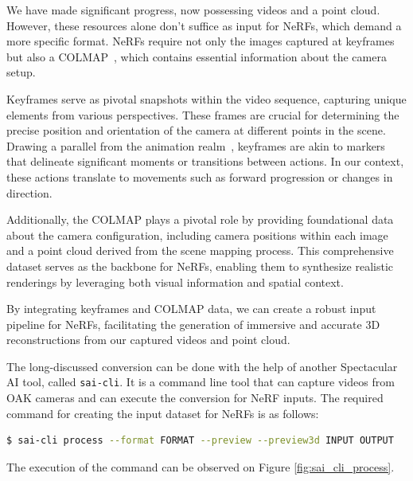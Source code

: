 We have made significant progress, now possessing videos and a point cloud. However, these resources alone don't suffice as input for NeRFs, which demand a more specific format. NeRFs require not only the images captured at keyframes but also a COLMAP~\cite{colmap}, which contains essential information about the camera setup.

Keyframes serve as pivotal snapshots within the video sequence, capturing unique elements from various perspectives. These frames are crucial for determining the precise position and orientation of the camera at different points in the scene. Drawing a parallel from the animation realm~\cite{keyframes_in_animation}, keyframes are akin to markers that delineate significant moments or transitions between actions. In our context, these actions translate to movements such as forward progression or changes in direction.

Additionally, the COLMAP plays a pivotal role by providing foundational data about the camera configuration, including camera positions within each image and a point cloud derived from the scene mapping process. This comprehensive dataset serves as the backbone for NeRFs, enabling them to synthesize realistic renderings by leveraging both visual information and spatial context.

By integrating keyframes and COLMAP data, we can create a robust input pipeline for NeRFs, facilitating the generation of immersive and accurate 3D reconstructions from our captured videos and point cloud.

The long-discussed conversion can be done with the help of another Spectacular AI tool, called \verb|sai-cli|. It is a command line tool that can capture videos from OAK cameras and can execute the conversion for NeRF inputs. The required command for creating the input dataset for NeRFs is as follows:

\FloatBarrier
\begin{lstlisting}[language=bash,frame=single,float=!ht]
$ sai-cli process --format FORMAT --preview --preview3d INPUT OUTPUT
\end{lstlisting}

The execution of the command can be observed on Figure \ref{fig:sai_cli_process}. 

